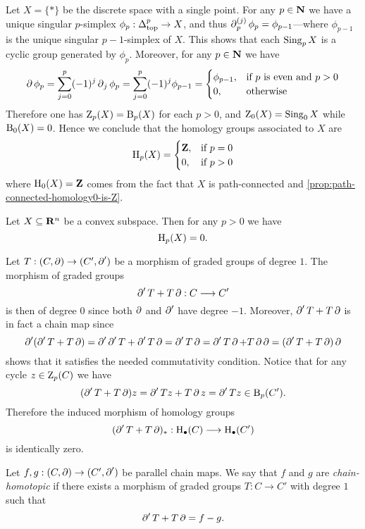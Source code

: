 \begin{example}
\label{exp:homology-of-point-space}
Let \(X = \{*\}\) be the discrete space with a single point. For any \(p \in
\mathbf{N}\) we have a unique singular \(p\)-simplex \(\phi_p: \Delta_{\text{top}}^p \to X\), and
thus \(\operatorname{\partial}_p^{(j)} \phi_p = \phi_{p-1}\)---where \(\phi_{p-1}\) is the unique
singular \(p-1\)-simplex of \(X\). This shows that each \(\operatorname{Sing}_p X\) is a
cyclic group generated by \(\phi_p\). Moreover, for any \(p \in \mathbf{N}\) we have
\[
\operatorname{\partial} \phi_p = \sum_{j=0}^p (-1)^j \operatorname{\partial}_j \phi_p
= \sum_{j=0}^p (-1)^j \phi_{p-1}
=
\begin{cases}
  \phi_{p-1}, &\text{if } p \text{ is even and } p > 0 \\
  0, &\text{otherwise}
\end{cases}
\]
Therefore one has \(\operatorname{Z}_p(X) = \operatorname{B}_p(X)\) for each \(p > 0\), and
\(\operatorname{Z}_0(X) = \operatorname{Sing}_0 X\) while \(\operatorname{B}_0(X) = 0\). Hence we conclude that the
homology groups associated to \(X\) are
\[
\operatorname{H}_p(X) =
\begin{cases}
  \mathbf{Z}, &\text{if } p = 0 \\
  0, &\text{if } p > 0
\end{cases}
\]
where \(\operatorname{H}_0(X) = \mathbf{Z}\) comes from the fact that \(X\) is path-connected and
\cref{prop:path-connected-homology0-is-Z}.
\end{example}

\begin{theorem}
\label{thm:convex-space-Rn-zero-homology}
Let \(X \subseteq \mathbf{R}^n\) be a convex subspace. Then for any \(p > 0\) we have
\[
\operatorname{H}_p(X) = 0.
\]
\end{theorem}

Let \(T: (C, \operatorname{\partial}) \to (C', \operatorname{\partial}')\) be a morphism of
graded groups of degree \(1\). The morphism of graded groups
\[
\operatorname{\partial}' T + T \operatorname{\partial}: C \longrightarrow C'
\]
is then of degree \(0\) since both \(\operatorname{\partial}\) and \(\operatorname{\partial}'\) have degree
\(-1\). Moreover, \(\operatorname{\partial}' T + T \operatorname{\partial}\) is in fact a chain map since
\[
\operatorname{\partial}'(\operatorname{\partial}' T + T \operatorname{\partial})
= \operatorname{\partial}' \operatorname{\partial}' T + \operatorname{\partial}' T \operatorname{\partial}
= \operatorname{\partial}' T \operatorname{\partial}
= \operatorname{\partial}' T \operatorname{\partial} + T \operatorname{\partial} \operatorname{\partial}
= (\operatorname{\partial}' T + T \operatorname{\partial}) \operatorname{\partial}
\]
shows that it satisfies the needed commutativity condition. Notice that for any
cycle \(z \in \operatorname{Z}_p(C)\) we have
\[
(\operatorname{\partial}' T + T \operatorname{\partial}) z = \operatorname{\partial}' T z + T \operatorname{\partial} z = \operatorname{\partial}' T z \in \operatorname{B}_p(C').
\]
Therefore the induced morphism of homology groups
\[
(\operatorname{\partial}' T + T \operatorname{\partial})_{*}: \operatorname{H}_{\bullet}(C) \longrightarrow \operatorname{H}_{\bullet}(C')
\]
is identically zero.

\begin{definition}
\label{def:chain-homotopic-maps}
Let \(f, g: (C, \operatorname{\partial}) \to (C', \operatorname{\partial}')\) be parallel chain
maps. We say that \(f\) and \(g\) are \emph{chain-homotopic} if there exists a
morphism of graded groups \(T: C \to C'\) with degree \(1\)
such that
\[
\operatorname{\partial}' T + T \operatorname{\partial} = f - g.
\]
\end{definition}

